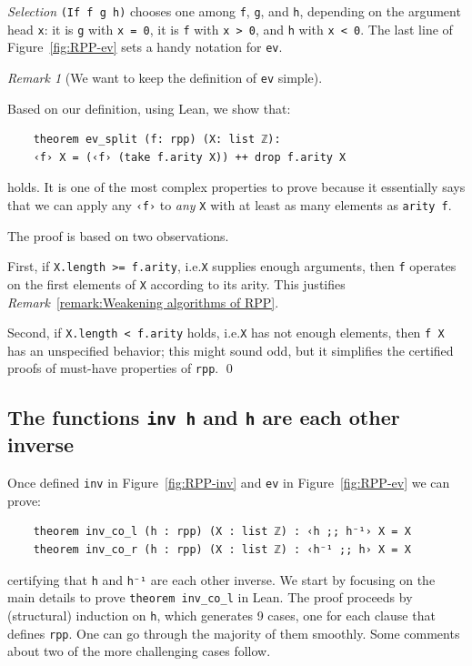\documentclass[preprint]{elsarticle}
\theoremstyle{remark}
\newtheorem{remark}{Remark}
\newcommand{\LEAN}{\textsf{Lean}\xspace}
\begin{document}
\vspace{\baselineskip}
\noindent
\emph{Selection} \lstinline|(If f g h)| chooses one among \lstinline|f|, \lstinline|g|, and \lstinline|h|, depending on the argument head \lstinline|x|: it is \lstinline|g| with \lstinline|x = 0|, it is \lstinline|f| with \lstinline|x > 0|, and \lstinline|h| with \lstinline|x < 0|.
The last line of Figure~\ref{fig:RPP-ev} sets a handy notation for \lstinline|ev|.

\begin{remark}[We want to keep the definition of \texttt{ev} simple]
\label{remark:We keep the definition of ev simple}

Based on our definition, using \LEAN, we show that:
\begin{lstlisting}
    theorem ev_split (f: rpp) (X: list ℤ):
    ‹f› X = (‹f› (take f.arity X)) ++ drop f.arity X
\end{lstlisting}
holds. It is one of the most complex properties to prove because it essentially says that we can apply any \lstinline|‹f›| to \emph{any} \lstinline|X| with at least as many elements as \lstinline|arity f|.

The proof is based on two observations.

First, if \lstinline|X.length >= f.arity|, i.e.\@ \lstinline|X| supplies enough arguments, then \lstinline|f| operates on the first elements of \lstinline|X| according to its arity. This justifies \textit{Remark}~\ref{remark:Weakening algorithms of RPP}.

Second, if \lstinline|X.length < f.arity| holds, i.e.\@ \lstinline|X| has not enough elements, then \lstinline|f X| has an unspecified behavior; this might sound odd, but it simplifies the certified proofs of must-have properties of \lstinline|rpp|.
\qed
\end{remark}

\subsection{The functions \texorpdfstring{\normalfont \lstinline|inv h|}{inv h} and \texorpdfstring{\normalfont \lstinline|h|}{h} are each other inverse}
Once defined \lstinline|inv| in Figure~\ref{fig:RPP-inv} and \lstinline|ev| in Figure~\ref{fig:RPP-ev} we can prove:
\begin{lstlisting}
    theorem inv_co_l (h : rpp) (X : list ℤ) : ‹h ;; h⁻¹› X = X
    theorem inv_co_r (h : rpp) (X : list ℤ) : ‹h⁻¹ ;; h› X = X
\end{lstlisting}
certifying that \lstinline|h| and \lstinline|h⁻¹| are each other inverse.
We start by focusing on the main details to prove \lstinline|theorem inv_co_l| in \LEAN. The proof proceeds by (structural) induction on \lstinline|h|, which generates 9 cases, one for each clause that defines \lstinline|rpp|. One can go through the majority of them smoothly.
Some comments about two of the more challenging cases follow.
\end{document}
